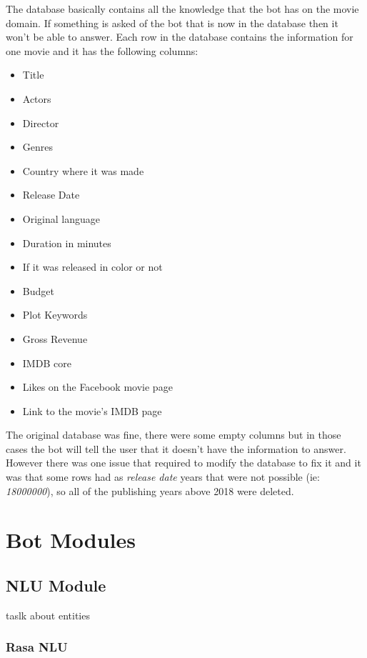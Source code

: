\documentclass[11pt,a4paper]{article}
\begin{document}
		The database basically contains all the knowledge that the bot has on the movie domain. If something is asked of the bot that is now in the database then it won't be able to answer. Each row in the database contains the information for one movie and it has the following columns:
		
		\begin{itemize}
		\setlength\itemsep{-0.48em}
			\item Title 
			\item Actors
			\item Director
			\item Genres
			\item Country where it was made
			\item Release Date
			\item Original language
			\item Duration in minutes
			\item If it was released in color or not
			\item Budget
			\item Plot Keywords
			\item Gross Revenue
			\item IMDB core
			\item Likes on the Facebook movie page
			\item Link to the movie's IMDB page
		\end{itemize}

		
		The original database was fine, there were some empty columns but in those cases the bot will tell the user that it doesn't have the information to answer. However there was one issue that required to modify the database to fix it and it was that some rows had as \textit{release date} years that were not possible (ie: \textit{18000000}), so all of the publishing years above 2018 were deleted.


\section{Bot Modules}
\label{sec-bot-modules}

\subsection{NLU Module}
\label{ssec-nlu-module}

taslk about entities

\subsubsection{Rasa NLU}
\label{ssec-rasa-nlu}
	
\end{document}

